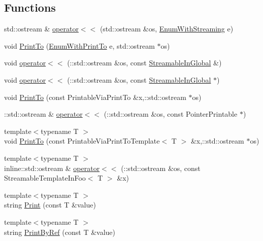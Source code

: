 \subsection*{\-Functions}
\begin{DoxyCompactItemize}
\item 
std\-::ostream \& \hyperlink{gtest-printers__test_8cc_ab3395b6b04bac565a0bd2fb36fbbb339}{operator$<$$<$} (std\-::ostream \&os, \hyperlink{gtest-printers__test_8cc_a52d9f846ca7a081ba3acf88dd6cd46dc}{\-Enum\-With\-Streaming} e)
\item 
void \hyperlink{gtest-printers__test_8cc_aad8245a4b48cd65607b86153d0f9dbe6}{\-Print\-To} (\hyperlink{gtest-printers__test_8cc_a904d619d593201ed509be794aed041ec}{\-Enum\-With\-Print\-To} e, std\-::ostream $\ast$os)
\item 
void \hyperlink{gtest-printers__test_8cc_a7b9d893679e433b9a70f15a9c9d6446c}{operator$<$$<$} (\-::std\-::ostream \&os, const \hyperlink{classStreamableInGlobal}{\-Streamable\-In\-Global} \&)
\item 
void \hyperlink{gtest-printers__test_8cc_a0794c66a458fe922bfb717080d047311}{operator$<$$<$} (\-::std\-::ostream \&os, const \hyperlink{classStreamableInGlobal}{\-Streamable\-In\-Global} $\ast$)
\item 
void \hyperlink{namespacefoo_a6808585dc0cb2884adeb4f39e3cb95cf}{\-Print\-To} (const \-Printable\-Via\-Print\-To \&x,\-::std\-::ostream $\ast$os)
\item 
\-::std\-::ostream \& \hyperlink{namespacefoo_a65f8809f6af7f69f5cc842493caf4491}{operator$<$$<$} (\-::std\-::ostream \&os, const \-Pointer\-Printable $\ast$)
\item 
{\footnotesize template$<$typename T $>$ }\\void \hyperlink{namespacefoo_a27945da9cb5c9d3d51b69e6429c2f46d}{\-Print\-To} (const \-Printable\-Via\-Print\-To\-Template$<$ \-T $>$ \&x,\-::std\-::ostream $\ast$os)
\item 
{\footnotesize template$<$typename T $>$ }\\inline\-::std\-::ostream \& \hyperlink{namespacefoo_abe04f604d114085b0b9af25600ef00da}{operator$<$$<$} (\-::std\-::ostream \&os, const \-Streamable\-Template\-In\-Foo$<$ \-T $>$ \&x)
\item 
{\footnotesize template$<$typename T $>$ }\\string \hyperlink{namespacetesting_1_1gtest__printers__test_adab26e59d2d7781c06a2c1c5948a8f65}{\-Print} (const \-T \&value)
\item 
{\footnotesize template$<$typename T $>$ }\\string \hyperlink{namespacetesting_1_1gtest__printers__test_a8e4be1dea6a05e53db4fd20d259ffdd7}{\-Print\-By\-Ref} (const \-T \&value)

\end{DoxyCompactItemize}
